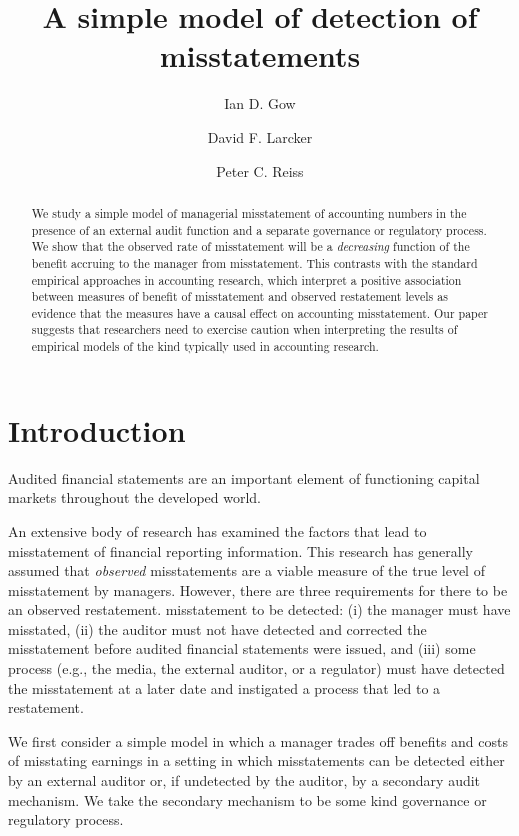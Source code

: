 \documentclass[11pt]{amsart}
\title[Audit model]{A simple model of detection of misstatements}
\author{Ian D. Gow \and David F. Larcker \and Peter C. Reiss}
\begin{document}
\maketitle

\begin{abstract}
We study a simple model of managerial misstatement of accounting numbers in the presence of an external audit function and a separate governance or regulatory process. We show that the observed rate of misstatement will be a \emph{decreasing} function of the benefit accruing to the manager from misstatement. This contrasts with the standard empirical approaches in accounting research, which interpret a positive association between measures of benefit of misstatement and observed restatement levels as evidence that the measures have a causal effect on accounting misstatement. Our paper suggests that researchers need to exercise caution when interpreting the results of empirical models of the kind typically used in accounting research. 
\end{abstract}


\section{Introduction}
Audited financial statements  are an important element of functioning capital markets throughout the developed world.

An extensive body of research has examined the factors that lead to misstatement of financial reporting information. This research has generally assumed that \emph{observed} misstatements are a viable measure of the true level of misstatement by managers. However, there are three requirements for there to be an observed restatement. misstatement to be detected: (i) the manager must have misstated, (ii) the auditor must not have detected and corrected the misstatement before audited financial statements were issued, and (iii) some process (e.g., the media, the external auditor, or a regulator) must have detected the misstatement at a later date and instigated a process that led to a restatement.

We first consider a simple model in which a manager trades off benefits and costs of misstating earnings in a setting in which misstatements can be detected either by an external auditor or,  if undetected by the auditor, by a secondary audit mechanism. We take the secondary mechanism to be some kind governance or regulatory process.
\end{document}
